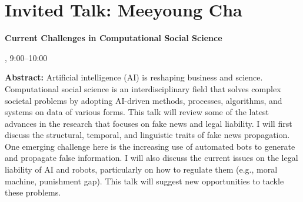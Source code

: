 \section{Invited Talk: Meeyoung Cha}


\begin{center}
\begin{Large}
{\bfseries\Large Current Challenges in Computational Social Science}\vspace{1em}\par
\end{Large}


\daydateyear, 9:00--10:00 \vspace{1em}\\
\vspace{1em}\par
\end{center}

\noindent
{\bfseries Abstract:} Artificial intelligence (AI) is reshaping business and science. Computational social science is an interdisciplinary field that solves complex societal problems by adopting AI-driven methods, processes, algorithms, and systems on data of various forms. This talk will review some of the latest advances in the research that focuses on fake news and legal liability. I will first discuss the structural, temporal, and linguistic traits of fake news propagation. One emerging challenge here is the increasing use of automated bots to generate and propagate false information. I will also discuss the current issues on the legal liability of AI and robots, particularly on how to regulate them (e.g., moral machine, punishment gap). This talk will suggest new opportunities to tackle these problems. 

\vspace{3em}\par 

\vfill
\noindent

